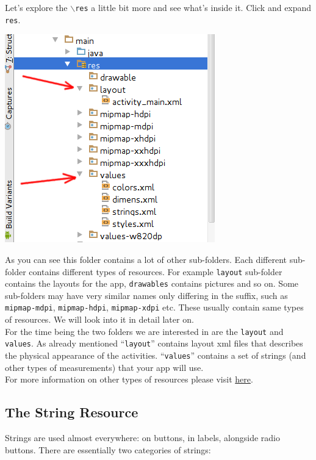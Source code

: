 Let's explore the \texttt{$\backslash$res} a little bit more and see what's inside it. Click and expand \texttt{res}. 

\begin{center}
	\includegraphics[scale=0.4]{chapters/ch04/images/2_res_folder}
\end{center}

As you can see this folder contains a lot of other sub-folders. Each different sub-folder contains different types of resources. For example \texttt{layout} sub-folder contains the layouts for the app, \texttt{drawables} contains pictures and so on. Some sub-folders may have very similar names only differing in the suffix, such as \texttt{mipmap-mdpi}, \texttt{mipmap-hdpi}, \texttt{mipmap-xdpi} etc. These usually contain same types of resources. We will look into it in detail later on. \\

For the time being the two folders we are interested in are the \texttt{layout} and \texttt{values}. As already mentioned ``\texttt{layout}'' contains layout xml files that describes the physical appearance of the activities. ``\texttt{values}'' contains a set of strings (and other types of measurements) that your app will use. \\

For more information on other types of resources please visit \href{https://developer.android.com/guide/topics/resources/available-resources.html}{here}.

\subsection{The String Resource}
Strings are used almost everywhere: on buttons, in labels, alongside radio buttons. There are essentially two categories of strings: 

